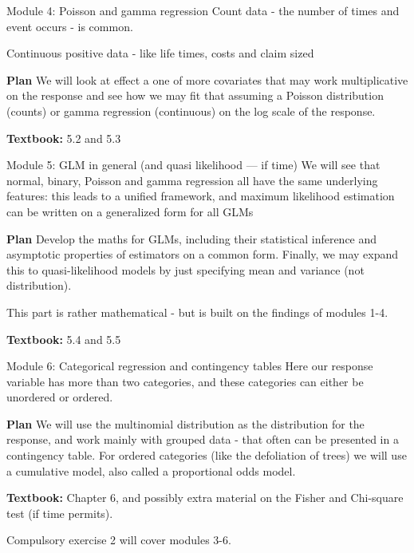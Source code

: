 \documentclass[
  ignorenonframetext,
]{beamer}
\begin{document}
\begin{frame}
\begin{block}{Module 4: Poisson and gamma regression}
\label{module-4-poisson-and-gamma-regression}
Count data - the number of times and event occurs - is common.

Continuous positive data - like life times, costs and claim sized

\textbf{Plan} We will look at effect a one of more covariates that may
work multiplicative on the response and see how we may fit that assuming
a Poisson distribution (counts) or gamma regression (continuous) on the
log scale of the response.

\textbf{Textbook:} 5.2 and 5.3
\end{block}
\end{frame}

\begin{frame}
\begin{block}{Module 5: GLM in general (and quasi likelihood --- if
time)}
\label{module-5-glm-in-general-and-quasi-likelihood-if-time}
We will see that normal, binary, Poisson and gamma regression all have
the same underlying features: this leads to a unified framework, and
maximum likelihood estimation can be written on a generalized form for
all GLMs

\textbf{Plan} Develop the maths for GLMs, including their statistical
inference and asymptotic properties of estimators on a common form.
Finally, we may expand this to quasi-likelihood models by just
specifying mean and variance (not distribution).

This part is rather mathematical - but is built on the findings of
modules 1-4.

\textbf{Textbook:} 5.4 and 5.5
\end{block}
\end{frame}

\begin{frame}
\begin{block}{Module 6: Categorical regression and contingency tables}
\label{module-6-categorical-regression-and-contingency-tables}
Here our response variable has more than two categories, and these
categories can either be unordered or ordered.

\textbf{Plan} We will use the multinomial distribution as the
distribution for the response, and work mainly with grouped data - that
often can be presented in a contingency table. For ordered categories
(like the defoliation of trees) we will use a cumulative model, also
called a proportional odds model.

\textbf{Textbook:} Chapter 6, and possibly extra material on the Fisher
and Chi-square test (if time permits).

Compulsory exercise 2 will cover modules 3-6.
\end{block}
\end{frame}
\end{document}
